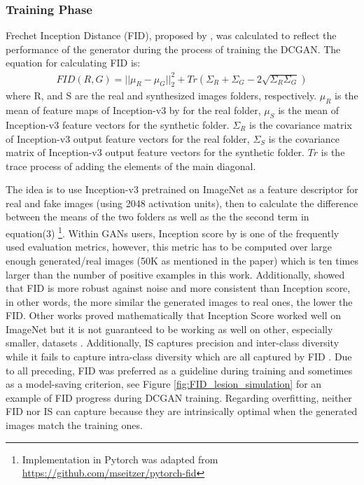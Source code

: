 \documentclass[final,3p,twocolumn,authoryear,sort&compress,times]{maia}
\begin{document}
\subsubsection{Training Phase}
\label{sec:eval_criteria_train}
Frechet Inception Distance (FID), proposed by \citet{FID_NIPS2017}, was calculated to reflect the performance of the generator during the process of training the DCGAN. The equation for calculating FID is:
\begin{align}
    FID(R, G) = ||\mu_R - \mu_G||_2^2 + Tr(\Sigma_R + \Sigma_G -2 \sqrt{\Sigma_R \Sigma_G}) 
\end{align}
where R, and S are the real and synthesized images folders, respectively. $\mu_R $ is the mean of feature maps of Inception-v3 by \citet{inception-v3} for the real folder, $\mu_S$ is the mean of Inception-v3 feature vectors for the synthetic folder.
$\Sigma_R$ is the covariance matrix of Inception-v3 output feature vectors for the real folder, $\Sigma_S$ is the covariance matrix of Inception-v3 output feature vectors for the synthetic folder.
$Tr$ is the trace process of adding the elements of the main diagonal.

The idea is to use Inception-v3 pretrained on ImageNet as a feature descriptor for real and fake images (using 2048 activation units), then to calculate the difference between the means of the two folders as well as the the second term in equation(3) \footnote{Implementation in Pytorch was adapted from \url{https://github.com/mseitzer/pytorch-fid}}. Within GANs users, Inception score by \citet{GANtraining_techniques} is one of the frequently used evaluation metrics, however, this metric has to be computed over large enough generated/real images (50K as mentioned in the paper) which is ten times larger than the number of positive examples in this work. Additionally, \citet{FID_NIPS2017} showed that FID is more robust against noise and more consistent than Inception score, in other words, the more similar the generated images to real ones, the lower the FID. Other works proved mathematically that Inception Score worked well on ImageNet but it is not guaranteed to be working as well on other, especially smaller, datasets \citep{a_note_on_IS}. Additionally, IS captures precision and inter-class diversity while it fails to capture intra-class diversity which are all captured by FID \citep{are_GANs_different}. Due to all preceding, FID was preferred as a guideline during training and sometimes as a model-saving criterion, see  Figure \ref{fig:FID_lesion_simulation} for an example of FID progress during DCGAN training. Regarding overfitting, neither FID nor IS can capture because they are intrinsically optimal when the generated images match the training ones.
\end{document}

